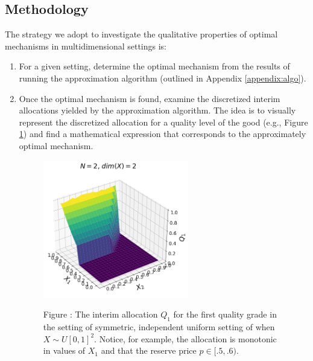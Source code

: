 \documentclass{article}
\newcounter{fig}
\begin{document}
\subsection{Methodology}\label{subsec_method}


The strategy we adopt to investigate the qualitative properties of optimal mechanisms in multidimensional settings is:

\begin{enumerate}
    \item For a given setting, determine the optimal mechanism from the results of running the approximation algorithm (outlined in Appendix \ref{appendix:algo}).

    \item Once the optimal mechanism is found, examine the discretized interim allocations yielded by the approximation algorithm. The idea is to visually represent the discretized allocation for a quality level of the good (e.g., Figure \ref{fig:belloni_n2_q1}) and find a mathematical expression that corresponds to the approximately optimal mechanism.

    \begin{figure}[H]
        \begin{center}
        \includegraphics[width=0.6\textwidth]{images/symmetric_independent_unif_01_Q1.png}
        \end{center}
        
        \vspace{1mm}
        \raggedright{\small {\sc Figure \thefig\label{fig:belloni_n2_q1}:} The interim allocation $Q_1$ for the first quality grade in the setting of symmetric, independent uniform setting of \autocite{pavlov2011optimal} when $X \sim U[0,1]^2$. Notice, for example, the allocation is monotonic in values of $X_1$ and that the reserve price $p \in [.5, .6)$.}
    \end{figure}


\end{enumerate}
\end{document}
